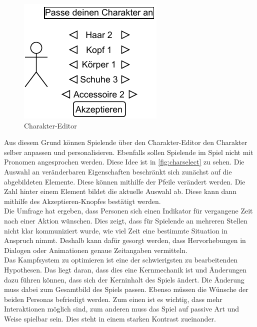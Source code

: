 \begin{figure}[H]
    \centering
    \includegraphics[width=0.5\columnwidth]{figures/wireframes/charselect.pdf}
    \caption{\label{fig:charselect}Charakter-Editor}
\end{figure}

Aus diesem Grund können Spielende über den Charakter-Editor den Charakter selber anpassen und personalisieren.
Ebenfalls sollen Spielende im Spiel nicht mit Pronomen angesprochen werden.
Diese Idee ist in \autoref{fig:charselect} zu sehen.
Die Auswahl an veränderbaren Eigenschaften beschränkt sich zunächst auf die abgebildeten Elemente.
Diese können mithilfe der Pfeile verändert werden.
Die Zahl hinter einem Element bildet die aktuelle Auswahl ab.
Diese kann dann mithilfe des Akzeptieren-Knopfes bestätigt werden. \\

Die Umfrage hat ergeben, dass Personen sich einen Indikator für vergangene Zeit nach einer Aktion wünschen.
Dies zeigt, dass für Spielende an mehreren Stellen nicht klar kommuniziert wurde, wie viel Zeit eine bestimmte Situation in Anspruch nimmt.
Deshalb kann dafür gesorgt werden, dass Hervorhebungen in Dialogen oder Animationen genaue Zeitangaben vermitteln.\\

Das Kampfsystem zu optimieren ist eine der schwierigsten zu bearbeitenden Hypothesen.
Das liegt daran, dass dies eine Kernmechanik ist und Änderungen dazu führen können, dass sich der Kerninhalt des Spiels ändert.
Die Änderung muss dabei zum Gesamtbild des Spiels passen.
Ebenso müssen die Wünsche der beiden Personas befriedigt werden.
Zum einen ist es wichtig, dass mehr Interaktionen möglich sind, zum anderen muss das Spiel auf passive Art und Weise spielbar sein.
Dies steht in einem starken Kontrast zueinander. \\

